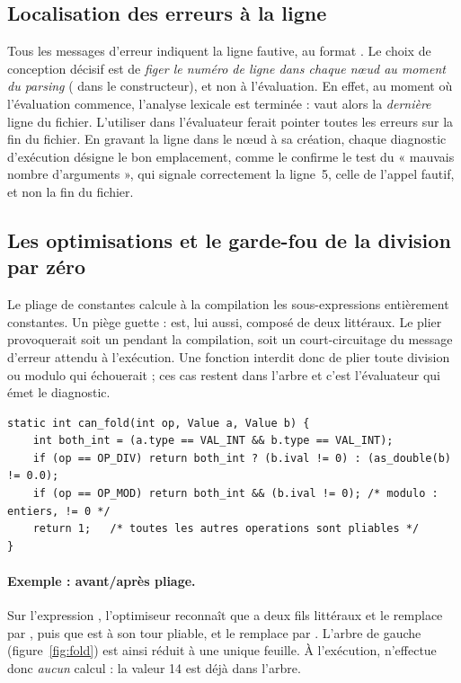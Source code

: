 \subsection{Localisation des erreurs à la ligne}

Tous les messages d'erreur indiquent la ligne fautive, au format
. Le choix de conception décisif est de \emph{figer le
numéro de ligne dans chaque n\oe ud au moment du parsing}
( dans le constructeur), et non à l'évaluation. En
effet, au moment où l'évaluation commence, l'analyse lexicale est terminée :
 vaut alors la \emph{dernière} ligne du fichier. L'utiliser dans
l'évaluateur ferait pointer toutes les erreurs sur la fin du fichier. En gravant
la ligne dans le n\oe ud à sa création, chaque diagnostic d'exécution désigne le
bon emplacement, comme le confirme le test du « mauvais nombre d'arguments », qui
signale correctement la ligne~5, celle de l'appel fautif, et non la fin du
fichier.

\subsection{Les optimisations et le garde-fou de la division par zéro}

Le pliage de constantes calcule à la compilation les sous-expressions
entièrement constantes. Un piège guette :  est, lui aussi, composé de
deux littéraux. Le plier provoquerait soit un  pendant la
compilation, soit un court-circuitage du message d'erreur attendu à l'exécution.
Une fonction  interdit donc de plier toute division ou modulo qui
échouerait ; ces cas restent dans l'arbre et c'est l'évaluateur qui émet le
diagnostic.

\begin{lstlisting}[style=c,caption={Garde-fou du pliage (extrait de \code{optim.c}).}]
static int can_fold(int op, Value a, Value b) {
    int both_int = (a.type == VAL_INT && b.type == VAL_INT);
    if (op == OP_DIV) return both_int ? (b.ival != 0) : (as_double(b) != 0.0);
    if (op == OP_MOD) return both_int && (b.ival != 0); /* modulo : entiers, != 0 */
    return 1;   /* toutes les autres operations sont pliables */
}
\end{lstlisting}

\paragraph{Exemple : avant/après pliage.} Sur l'expression ,
l'optimiseur reconnaît que  a deux fils littéraux et le remplace par
, puis que  est à son tour pliable, et le remplace par
. L'arbre de gauche (figure~\ref{fig:fold}) est ainsi réduit à une
unique feuille. À l'exécution,  n'effectue donc
\emph{aucun} calcul : la valeur 14 est déjà dans l'arbre.

